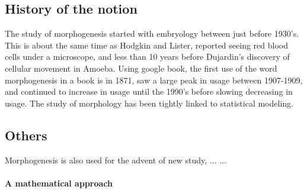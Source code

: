 \documentclass{article}
\begin{document}
\subsection{History of the notion}
The study of morphogenesis started with embryology between just before 1930's. This is about the same time as Hodgkin and Lister, reported seeing red blood cells under a microscope, and less than 10 years before Dujardin's discovery of cellular movement in Amoeba. \cite{abercrombie1977concepts} Using google book, the first use of the word morphogenesis in a book is in 1871, saw a large peak in usage between 1907-1909, and continued to increase in usage until the 1990's before slowing decreasing in usage. 
The study of morphology has been tightly linked to statistical modeling. 




\subsection{Others}
Morphogenesis is also used for the advent of new study, \cite{gilbert2003morphogenesis}
... ... 

\bigskip

\paragraph{A mathematical approach}
\end{document}
